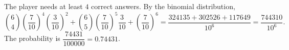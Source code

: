 The player needs at least $4$ correct answers. By the binomial distribution,
\[\binom64\left(\dfrac7{10}\right)^4\left(\dfrac3{10}\right)^2+\binom65\left(\dfrac7{10}\right)^5\dfrac3{10}+\left(\dfrac7{10}\right)^6=\dfrac{324135+302526+117649}{10^6}=\dfrac{744310}{10^6}.\]
The probability is $\boxed{\dfrac{74431}{100000}}=0.74431$.
